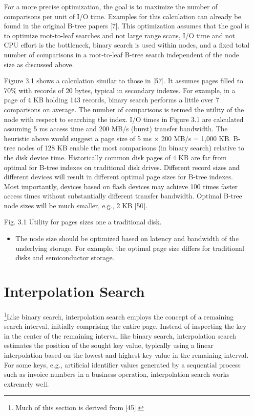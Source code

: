 For a more precise optimization, the goal is to maximize the number of
comparisons per unit of I/O time. Examples for this calculation can
already be found in the original B-tree papers {[}7{]}. This
optimization assumes that the goal is to optimize root-to-leaf searches
and not large range scans, I/O time and not CPU effort is the
bottleneck, binary search is used within nodes, and a fixed total number
of comparisons in a root-to-leaf B-tree search independent of the node
size as discussed above.

Figure 3.1 shows a calculation similar to those in {[}57{]}. It assumes
pages filled to 70\% with records of 20 bytes, typical in secondary
indexes. For example, in a page of 4 KB holding 143 records, binary
search performs a little over 7 comparisons on average. The number of
comparisons is termed the utility of the node with respect to searching
the index. I/O times in Figure 3.1 are calculated assuming 5 ms access
time and 200 MB/s (burst) transfer bandwidth. The heuristic above would
suggest a page size of 5 ms × 200 MB/s = 1,000 KB. B-tree nodes of 128
KB enable the most comparisons (in binary search) relative to the disk
device time. Historically common disk pages of 4 KB are far from optimal
for B-tree indexes on traditional disk drives. Different record sizes
and different devices will result in different optimal page sizes for
B-tree indexes. Most importantly, devices based on flash devices may
achieve 100 times faster access times without substantially different
transfer bandwidth. Optimal B-tree node sizes will be much smaller,
e.g., 2 KB {[}50{]}.

Fig. 3.1 Utility for pages sizes one a traditional disk.

\begin{itemize}
\item
  The node size should be optimized based on latency and bandwidth of
  the underlying storage. For example, the optimal page size differs for
  traditional disks and semiconductor storage.
\end{itemize}

\hypertarget{interpolation-search}{%
\section{Interpolation Search}\label{interpolation-search}}

\footnote{Much of this section is derived from {[}45{]}.}Like binary
search, interpolation search employs the concept of a remaining search
interval, initially comprising the entire page. Instead of inspecting
the key in the center of the remaining interval like binary search,
interpolation search estimates the position of the sought key value,
typically using a linear interpolation based on the lowest and highest
key value in the remaining interval. For some keys, e.g., artificial
identifier values generated by a sequential process such as invoice
numbers in a business operation, interpolation search works extremely
well.

